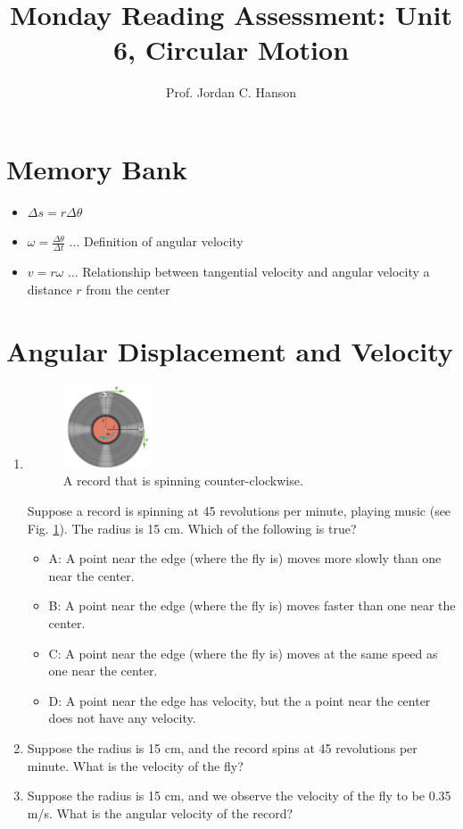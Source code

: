 \documentclass{article}
\begin{document}
\title{Monday Reading Assessment: Unit 6, Circular Motion}
\author{Prof. Jordan C. Hanson}

\maketitle

\section{Memory Bank}

\begin{itemize}
\item $\Delta s = r \Delta \theta$
\item $\omega = \frac{\Delta \theta}{\Delta t}$ ... Definition of angular velocity
\item $v = r\omega $ ... Relationship between tangential velocity and angular velocity a distance $r$ from the center
\end{itemize}

\section{Angular Displacement and Velocity}

\begin{enumerate}
\item 
\begin{figure}[ht]
\centering
\includegraphics[width=0.25\textwidth]{record.png}
\caption{\label{fig:record} A record that is spinning counter-clockwise.}
\end{figure}

Suppose a record is spinning at 45 revolutions per minute, playing music (see Fig. \ref{fig:record}).  The radius is 15 cm.  Which of the following is true?
\begin{itemize}
\item A: A point near the edge (where the fly is) moves more slowly than one near the center. 
\item B: A point near the edge (where the fly is) moves faster than one near the center.
\item C: A point near the edge (where the fly is) moves at the same speed as one near the center.
\item D: A point near the edge has velocity, but the a point near the center does not have any velocity.
\end{itemize}
\item Suppose the radius is 15 cm, and the record spins at 45 revolutions per minute.  What is the velocity of the fly? \\ \vspace{2cm}
\item Suppose the radius is 15 cm, and we observe the velocity of the fly to be 0.35 m/s.  What is the angular velocity of the record?
\end{enumerate}
\end{document}
